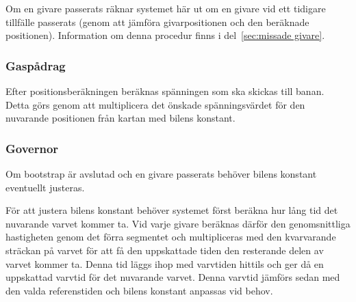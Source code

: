 Om en givare passerats räknar systemet här ut om en givare vid ett tidigare
tillfälle passerats (genom att jämföra givarpositionen och den beräknade
positionen). Information om denna procedur finns i del~\ref{sec:missade givare}.


\subsubsection{Gaspådrag}

Efter positionsberäkningen beräknas spänningen som ska skickas till banan. Detta
görs genom att multiplicera det önskade spänningsvärdet för den nuvarande
positionen från kartan med bilens konstant.

% 
%  

\subsubsection{Governor}
\label{sec:systembeskrivning:governor}

Om bootstrap är avslutad och en givare passerats behöver bilens konstant
eventuellt justeras. 

För att justera bilens konstant behöver systemet först beräkna hur lång tid det
nuvarande varvet kommer ta. Vid varje givare beräknas därför den genomsnittliga
hastigheten genom det förra segmentet och multipliceras med den kvarvarande
sträckan på varvet för att få den uppskattade tiden den resterande delen av
varvet kommer ta. Denna tid läggs ihop med varvtiden hittils och ger då en
uppskattad varvtid för det nuvarande varvet. Denna varvtid jämförs sedan med den
valda referenstiden och bilens konstant anpassas vid behov.

